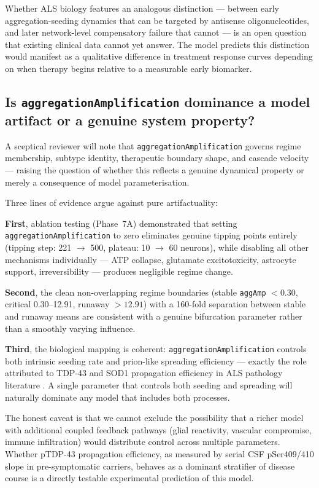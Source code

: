 \documentclass[12pt,a4paper]{article}
\begin{document}
Whether ALS biology features an analogous distinction --- between early aggregation-seeding
dynamics that can be targeted by antisense oligonucleotides, and later network-level
compensatory failure that cannot --- is an open question that existing clinical data cannot yet
answer. The model predicts this distinction would manifest as a qualitative difference in
treatment response curves depending on when therapy begins relative to a measurable early
biomarker.

\subsection{Is \texttt{aggregationAmplification} dominance a model artifact or a genuine
system property?}

A sceptical reviewer will note that \texttt{aggregationAmplification} governs regime membership,
subtype identity, therapeutic boundary shape, and cascade velocity --- raising the question of
whether this reflects a genuine dynamical property or merely a consequence of model
parameterisation.

Three lines of evidence argue against pure artifactuality:

\textbf{First}, ablation testing (Phase~7A) demonstrated that setting
\texttt{aggregationAmplification} to zero eliminates genuine tipping points entirely (tipping
step: 221 $\to$ 500, plateau: 10 $\to$ 60 neurons), while disabling all other mechanisms
individually --- ATP collapse, glutamate excitotoxicity, astrocyte support, irreversibility ---
produces negligible regime change.

\textbf{Second}, the clean non-overlapping regime boundaries (stable \texttt{aggAmp} $< 0.30$,
critical 0.30--12.91, runaway $> 12.91$) with a 160-fold separation between stable and runaway
means are consistent with a genuine bifurcation parameter rather than a smoothly varying
influence.

\textbf{Third}, the biological mapping is coherent: \texttt{aggregationAmplification} controls
both intrinsic seeding rate and prion-like spreading efficiency --- exactly the role attributed
to TDP-43 and SOD1 propagation efficiency in ALS pathology literature
\citep{nonaka2013,smethurst2016}. A single parameter that controls both seeding and spreading
will naturally dominate any model that includes both processes.

The honest caveat is that we cannot exclude the possibility that a richer model with additional
coupled feedback pathways (glial reactivity, vascular compromise, immune infiltration) would
distribute control across multiple parameters. Whether pTDP-43 propagation efficiency, as
measured by serial CSF pSer409/410 slope in pre-symptomatic carriers, behaves as a dominant
stratifier of disease course is a directly testable experimental prediction of this model.
\end{document}
